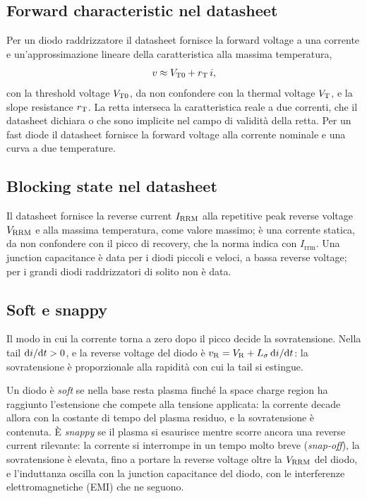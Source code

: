 \documentclass[10pt,a4paper]{scrartcl}
\let\newcommand\pdvaluedefine
\newcommand{\VR}{V_\mathrm{R}}
\newcommand{\VT}{V_\mathrm{T}}
\newcommand{\VTo}{V_\mathrm{T0}}
\newcommand{\rT}{r_\mathrm{T}}
\newcommand{\Vrrm}{V_\mathrm{RRM}}
\newcommand{\Irrm}{I_\mathrm{RRM}}
\newcommand{\diff}{\mathrm{d}}
\newcommand{\Ls}{L_\sigma}                    %
\begin{document}
\subsection{Forward characteristic nel datasheet}
Per un diodo raddrizzatore il datasheet fornisce la forward voltage a una corrente e un'approssimazione lineare della caratteristica alla massima temperatura,
\begin{equation}
v \approx \VTo + \rT\, i ,
\label{eq:line}
\end{equation}
con la threshold voltage $\VTo$, da non confondere con la thermal voltage $\VT$, e la slope resistance $\rT$. La retta interseca la caratteristica reale a due correnti, che il datasheet dichiara o che sono implicite nel campo di validità della retta. Per un fast diode il datasheet fornisce la forward voltage alla corrente nominale e una curva a due temperature.

\subsection{Blocking state nel datasheet}
Il datasheet fornisce la reverse current $\Irrm$ alla repetitive peak reverse voltage $\Vrrm$ e alla massima temperatura, come valore massimo; è una corrente statica, da non confondere con il picco di recovery, che la norma indica con $I_\mathrm{rrm}$. Una junction capacitance è data per i diodi piccoli e veloci, a bassa reverse voltage; per i grandi diodi raddrizzatori di solito non è data.
\subsection{Soft e snappy}
\label{sec:softsnappy}
Il modo in cui la corrente torna a zero dopo il picco decide la sovratensione. Nella tail $\diff i/\diff t > 0$, e la reverse voltage del diodo è $v_\mathrm{R} = \VR + \Ls\,\diff i/\diff t$: la sovratensione è proporzionale alla rapidità con cui la tail si estingue.

Un diodo è \emph{soft} se nella base resta plasma finché la space charge region ha raggiunto l'estensione che compete alla tensione applicata: la corrente decade allora con la costante di tempo del plasma residuo, e la sovratensione è contenuta. È \emph{snappy} se il plasma si esaurisce mentre scorre ancora una reverse current rilevante: la corrente si interrompe in un tempo molto breve (\emph{snap-off}), la sovratensione è elevata, fino a portare la reverse voltage oltre la $\Vrrm$ del diodo, e l'induttanza oscilla con la junction capacitance del diodo, con le interferenze elettromagnetiche (EMI) che ne seguono.
\end{document}
